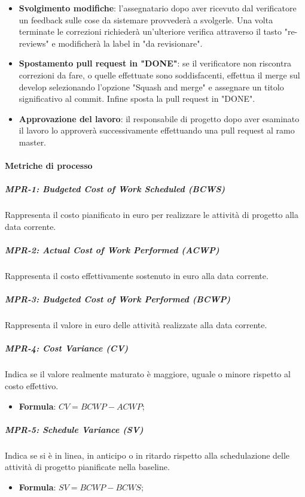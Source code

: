 \begin{itemize}
    \item \textbf{Svolgimento modifiche}: l'assegnatario dopo aver ricevuto dal verificatore un feedback sulle cose da sistemare provvederà a svolgerle. Una volta terminate le correzioni richiederà un'ulteriore verifica attraverso il tasto "re-reviews" e modificherà la label in "da revisionare".
    \item \textbf{Spostamento pull request in "DONE"}: se il verificatore non riscontra correzioni da fare, o quelle effettuate sono soddisfacenti, effettua il merge sul develop selezionando l'opzione "Squash and merge" e assegnare un titolo significativo al commit. Infine sposta la pull request in "DONE".
    \item \textbf{Approvazione del lavoro}: il responsabile di progetto dopo aver esaminato il lavoro lo approverà successivamente effettuando una pull request al ramo master.
\end{itemize}

\paragraph{Metriche di processo} \label{_metricheprocesso}
\subparagraph{MPR-1: Budgeted Cost of Work Scheduled (BCWS)} \label{_MPR-1}
Rappresenta il costo pianificato in euro per realizzare le attività di progetto alla data corrente.

\subparagraph{MPR-2: Actual Cost of Work Performed (ACWP)} \label{_MPR-2}
Rappresenta il costo effettivamente sostenuto in euro alla data corrente.

\subparagraph{MPR-3: Budgeted Cost of Work Performed (BCWP)} \label{_MPR-3}
Rappresenta il valore in euro delle attività realizzate alla data corrente.

\subparagraph{MPR-4: Cost Variance (CV)} \label{_MPR-4}
Indica se il valore realmente maturato è maggiore, uguale o minore rispetto al costo effettivo.
\begin{itemize}
    \item \textbf{Formula}: $CV = BCWP - ACWP$;
\end{itemize}

\subparagraph{MPR-5: Schedule Variance (SV)} \label{_MPR-5}
Indica se si è in linea, in anticipo o in ritardo rispetto alla schedulazione delle attività di progetto pianificate nella baseline.
\begin{itemize}
    \item \textbf{Formula}: $SV = BCWP - BCWS$;
\end{itemize}


